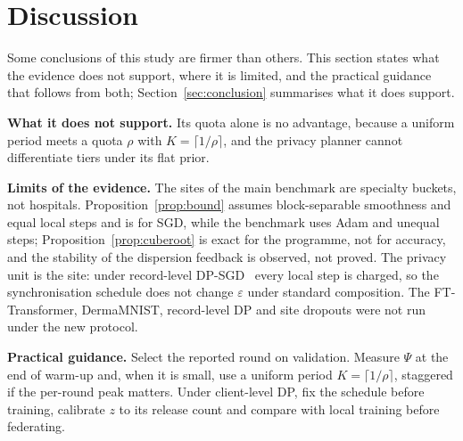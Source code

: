 \section{Discussion}
\label{sec:discussion}
Some conclusions of this study are firmer than others. This section states what the evidence does not support, where it is limited, and the practical guidance that follows from both; Section~\ref{sec:conclusion} summarises what it does support.

\textbf{What it does not support.}  Its quota alone is no advantage, because a uniform period meets a quota $\rho$ with $K=\lceil1/\rho\rceil$, and the privacy planner cannot differentiate tiers under its flat prior.

\textbf{Limits of the evidence.} The sites of the main benchmark are specialty buckets, not hospitals. Proposition~\ref{prop:bound} assumes block-separable smoothness and equal local steps and is for SGD, while the benchmark uses Adam and unequal steps; Proposition~\ref{prop:cuberoot} is exact for the programme, not for accuracy, and the stability of the dispersion feedback is observed, not proved. The privacy unit is the site: under record-level DP-SGD~\cite{liu2022crosssilo,liu2024recordlevel} every local step is charged, so the synchronisation schedule does not change $\varepsilon$ under standard composition. The FT-Transformer, DermaMNIST, record-level DP and site dropouts were not run under the new protocol.

\textbf{Practical guidance.} Select the reported round on validation. Measure $\Psi$ at the end of warm-up and, when it is small, use a uniform period $K=\lceil1/\rho\rceil$, staggered if the per-round peak matters. Under client-level DP, fix the schedule before training, calibrate $z$ to its release count and compare with local training before federating.
